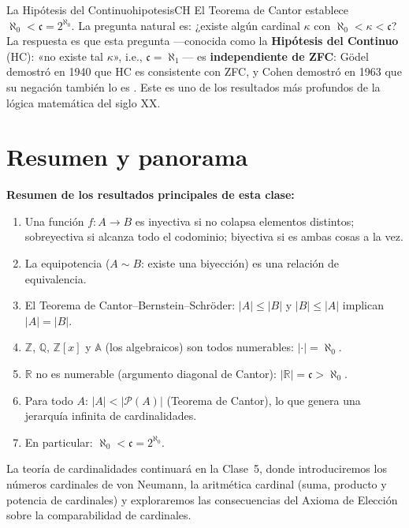 \begin{observacion}{La Hipótesis del Continuo}{hipotesisCH}
El Teorema de Cantor establece $\aleph_0 < \mathfrak{c} = 2^{\aleph_0}$. La pregunta natural es: ¿existe algún cardinal $\kappa$ con $\aleph_0 < \kappa < \mathfrak{c}$? La respuesta es que esta pregunta —conocida como la \textbf{Hipótesis del Continuo} (HC): «no existe tal $\kappa$», i.e., $\mathfrak{c} = \aleph_1$— es \textbf{independiente de ZFC}: Gödel demostró en 1940 que HC es consistente con ZFC, y Cohen demostró en 1963 que su negación también lo es \cite{godel1940, cohen1966}. Este es uno de los resultados más profundos de la lógica matemática del siglo XX.
\end{observacion}

\section{Resumen y panorama}

\begin{importante}
\textbf{Resumen de los resultados principales de esta clase:}
\begin{enumerate}[leftmargin=2em, label=\textbf{\arabic*.}]
  \item Una función $f: A \to B$ es inyectiva si no colapsa elementos distintos; sobreyectiva si alcanza todo el codominio; biyectiva si es ambas cosas a la vez.
  \item La equipotencia ($A \sim B$: existe una biyección) es una relación de equivalencia.
  \item El Teorema de Cantor–Bernstein–Schröder: $|A| \leq |B|$ y $|B| \leq |A|$ implican $|A| = |B|$.
  \item $\mathbb{Z}$, $\mathbb{Q}$, $\mathbb{Z}[x]$ y $\mathbb{A}$ (los algebraicos) son todos numerables: $|\cdot| = \aleph_0$.
  \item $\mathbb{R}$ no es numerable (argumento diagonal de Cantor): $|\mathbb{R}| = \mathfrak{c} > \aleph_0$.
  \item Para todo $A$: $|A| < |\mathcal{P}(A)|$ (Teorema de Cantor), lo que genera una jerarquía infinita de cardinalidades.
  \item En particular: $\aleph_0 < \mathfrak{c} = 2^{\aleph_0}$.
\end{enumerate}
\end{importante}

La teoría de cardinalidades continuará en la Clase~5, donde introduciremos los números cardinales de von Neumann, la aritmética cardinal (suma, producto y potencia de cardinales) y exploraremos las consecuencias del Axioma de Elección sobre la comparabilidad de cardinales.

